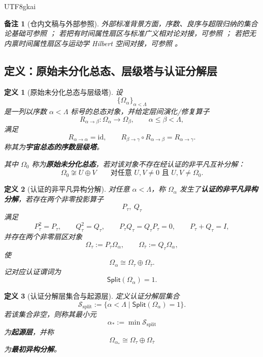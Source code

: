 \documentclass[12pt]{article}
\newtheorem{definition}{定义}[section]
\newtheorem{remark}{备注}[section]
\newcommand{\id}{\mathrm{id}}
\begin{document}
\begin{CJK*}{UTF8}{gkai}
\begin{remark}[仓内文稿与外部参照]
外部标准背景方面，序数、良序与超限归纳的集合论基础可参照
\cite{Jech2003SetTheory,Kunen2011SetTheory}；
若把有时间属性扇区与标准广义相对论对接，可参照
\cite{Wald1984GeneralRelativity}；
若把无内禀时间属性扇区与运动学 Hilbert 空间对接，可参照
\cite{SakuraiNapolitano2017MQM}。
\end{remark}

\subsection{定义：原始未分化总态、层级塔与认证分解层}
\label{subsec:tex43-ch4-definitions}

\begin{definition}[原始未分化总态与层级塔]
\label{def:tex43-origin-tower}
设
\[
  \{\Omega_\alpha\}_{\alpha<\Lambda}
\]
是一列以序数 $\alpha<\Lambda$ 标号的总态对象，并给定层间演化/修复算子
\[
  R_{\alpha\to\beta}:\Omega_\alpha\to\Omega_\beta,
  \qquad
  \alpha\le \beta<\Lambda,
\]
满足
\[
  R_{\alpha\to\alpha}=\id,
  \qquad
  R_{\beta\to\gamma}\circ R_{\alpha\to\beta}=R_{\alpha\to\gamma}.
\]
称其为\textbf{宇宙总态的序数层级塔}。

其中 $\Omega_0$ 称为\textbf{原始未分化总态}，若对该对象不存在经认证的非平凡互补分解：
\[
  \Omega_0 \not\cong U\oplus V
  \qquad
  \text{对任意 }U,V\neq 0\text{ 且 }U,V\neq \Omega_0.
\]
\end{definition}

\begin{definition}[认证的非平凡异构分解]
\label{def:tex43-certified-split}
对任意 $\alpha<\Lambda$，称 $\Omega_\alpha$ 发生了\textbf{认证的非平凡异构分解}，若存在两个非零投影算子
\[
  P_\tau,\ Q_\tau
\]
满足
\[
  P_\tau^2=P_\tau,
  \qquad
  Q_\tau^2=Q_\tau,
  \qquad
  P_\tau Q_\tau=Q_\tau P_\tau=0,
  \qquad
  P_\tau+Q_\tau=I,
\]
并存在两个非零扇区对象
\[
  \Omega_\tau:=P_\tau\Omega_\alpha,
  \qquad
  \Omega_{\bar\tau}:=Q_\tau\Omega_\alpha,
\]
使
\[
  \Omega_\alpha\cong \Omega_\tau\oplus \Omega_{\bar\tau}.
\]
记对应认证谓词为
\[
  \mathsf{Split}(\Omega_\alpha)=1.
\]
\end{definition}

\begin{definition}[认证分解层集合与起源层]
\label{def:tex43-origin-layer}
定义认证分解层集合
\[
  \mathcal S_{\mathrm{split}}
  :=
  \{\alpha<\Lambda\mid \mathsf{Split}(\Omega_\alpha)=1\}.
\]
若该集合非空，则称其最小元
\[
  \alpha_\ast:=\min \mathcal S_{\mathrm{split}}
\]
为\textbf{起源层}，并称
\[
  \Omega_{\alpha_\ast}\cong \Omega_\tau\oplus \Omega_{\bar\tau}
\]
为\textbf{最初异构分解}。
\end{definition}


\end{CJK*}
\end{document}
